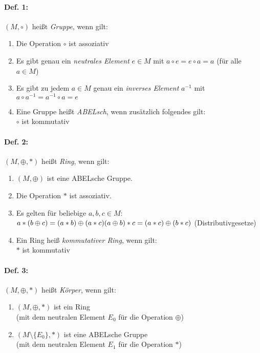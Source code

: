 \paragraph{Def. 1:}\parskp
$(M,\circ)$ heißt \emph{Gruppe}, wenn gilt:
\begin{enumerate}
\item Die Operation $\circ$ ist assoziativ
\item Es gibt genau ein \emph{neutrales Element} $e\in M$ mit $a\circ e = e\circ a = a$ (für alle $a \in M$)
\item Es gibt zu jedem $a \in M$ genau ein \emph{inverses Element} $a^{-1}$ mit $a\circ a^{-1}=a^{-1}\circ a = e$
\item Eine Gruppe heißt \emph{ABELsch}, wenn zusätzlich folgendes gilt:\\
$\circ$ ist kommutativ
\end{enumerate}

\paragraph{Def. 2:}\parskp
$(M,\oplus,*)$ heißt \emph{Ring}, wenn gilt:
\begin{enumerate}
\item $(M, \oplus)$ ist eine ABELsche Gruppe.
\item Die Operation $*$ ist assoziativ.
\item Es gelten für beliebige $a,b,c\in M$:\\
$a*(b\oplus c)=(a*b)\oplus (a*c)\\
(a \oplus b) *c = (a*c) \oplus (b*c)$ \qquad (Distributivgesetze)
\item Ein Ring heiß \emph{kommutativer Ring}, wenn gilt:\\
$*$ ist kommutativ
\end{enumerate}

\paragraph{Def. 3:}\parskp
$(M, \oplus, *)$ heißt \emph{Körper}, wenn gilt:
\begin{enumerate}
\item $(M,\oplus, *)$ ist ein Ring \\
(mit dem neutralen Element $E_0$ für die Operation $\oplus$)
\item $(M\setminus \{E_0\}, *)$ ist eine ABELsche Gruppe\\
(mit dem neutralen Element $E_1$ für die Operation $*$)
\end{enumerate}

